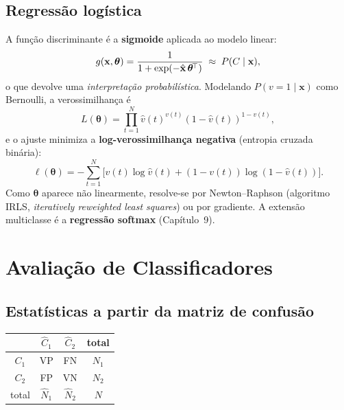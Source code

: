 \subsection{Regressão logística}

A função discriminante é a \textbf{sigmoide} aplicada ao modelo linear:
\[
g(\mathbf{x},\boldsymbol\theta)=
\frac{1}{1+\exp(-\hat{\mathbf{x}}\,\boldsymbol\theta^{\!\top})}\;\approx\; P(C\mid\mathbf{x}),
\]
o que devolve uma \emph{interpretação probabilística}. Modelando
$P(v=1\mid\mathbf{x})$ como Bernoulli, a verossimilhança é
\[
L(\boldsymbol\theta)=\prod_{t=1}^{N}\hat v(t)^{v(t)}(1-\hat v(t))^{1-v(t)},
\]
e o ajuste minimiza a \textbf{log-verossimilhança negativa} (entropia
cruzada binária):
\[
\ell(\boldsymbol\theta)=-\sum_{t=1}^{N}\bigl[v(t)\log\hat v(t)+(1-v(t))\log(1-\hat v(t))\bigr].
\]
Como $\boldsymbol\theta$ aparece não linearmente, resolve-se por
Newton--Raphson (algoritmo IRLS, \emph{iteratively reweighted least
squares}) ou por gradiente. A extensão multiclasse é a
\textbf{regressão softmax} (Capítulo~9).

\section{Avaliação de Classificadores}

\subsection{Estatísticas a partir da matriz de confusão}

\begin{center}
\begin{tabular}{c|cc|c}
\toprule
 & $\hat C_1$ & $\hat C_2$ & total \\
\midrule
$C_1$ & VP & FN & $N_1$ \\
$C_2$ & FP & VN & $N_2$ \\
\midrule
total & $\hat N_1$ & $\hat N_2$ & $N$ \\
\bottomrule
\end{tabular}
\end{center}

